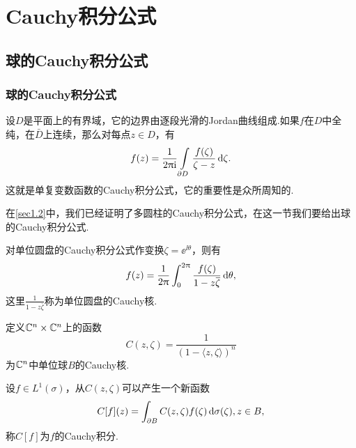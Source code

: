 \chapter{Cauchy积分公式\label{chap4}}
\section{球的Cauchy积分公式\label{sec4.1}}
\subsection{球的Cauchy积分公式}
设$D$是平面上的有界域，它的边界由逐段光滑的Jordan曲线组成.如果$f$在$D$中全纯，在$\bar{D}$上连续，那么对每点$z\in D$，有
\[f(z)=\frac1{2\uppi\mathrm i}\int\limits_{\partial D}\frac{f(\zeta)}{\zeta-z}\mathop{}\!\mathrm{d}\zeta.\]
这就是单复变数函数的Cauchy积分公式，它的重要性是众所周知的.

在\ref{sec1.2}中，我们已经证明了多圆柱的Cauchy积分公式，在这一节我们要给出球的Cauchy积分公式.

对单位圆盘的Cauchy积分公式作变换$\zeta=\ee^{\ii\theta}$，则有
\[f(z)=\frac1{2\uppi}\int_{0}^{2\uppi}\frac{f(\zeta)}{1-z{}\mkern1mu\overline{\mkern-1mu\zeta}}\mathop{}\!\mathrm{d}\theta,\]
这里$\frac1{1-z\bar{\zeta}}$称为单位圆盘的Cauchy核.

定义$\mathbb C^n\times\mathbb C^n$上的函数
\[C(z,\zeta)=\frac1{(1-\langle z,\zeta\rangle)^n}\]
为$\mathbb C^n$中单位球$B$的Cauchy核.

设$f\in L^1(\sigma)$，从$C(z,\zeta)$可以产生一个新函数
\[C[f](z)=\int_{\partial B} C(z,\zeta)f(\zeta)\mathop{}\!\mathrm{d}\sigma(\zeta),z\in B,\]
称$C[f]$为$f$的Cauchy积分.

